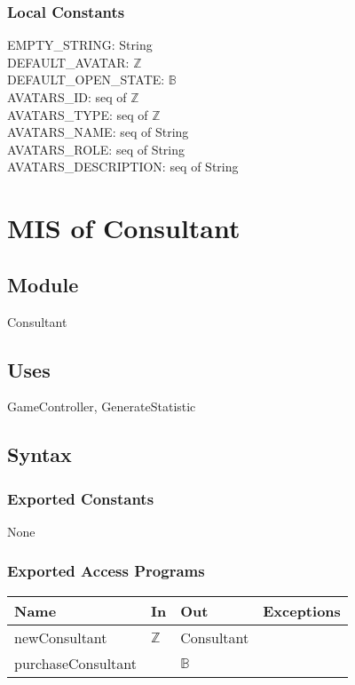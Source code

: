 \documentclass[12pt, titlepage]{article}
\begin{document}
\subsubsection{Local Constants}
EMPTY\_STRING: String\\
DEFAULT\_AVATAR: $\mathbb{Z}$\\
DEFAULT\_OPEN\_STATE: $\mathbb{B}$\\
AVATARS\_ID: seq of $\mathbb{Z}$\\
AVATARS\_TYPE: seq of $\mathbb{Z}$\\
AVATARS\_NAME: seq of  String\\
AVATARS\_ROLE: seq of String\\
AVATARS\_DESCRIPTION: seq of String\\

\newpage


\section{MIS of Consultant} 


\subsection{Module}
Consultant

\subsection{Uses}
GameController, GenerateStatistic


\subsection{Syntax}

\subsubsection{Exported Constants}
None

\subsubsection{Exported Access Programs}

\begin{center}
\begin{tabular}{p{3cm} p{4cm} p{4cm} p{2cm}}
\hline
\textbf{Name} & \textbf{In} & \textbf{Out} & \textbf{Exceptions} \\
\hline
newConsultant & $\mathbb{Z}$ & Consultant & \\
\hline

purchaseConsultant &  & $\mathbb{B}$ & \\
\hline
\end{tabular}
\end{center}
\end{document}
